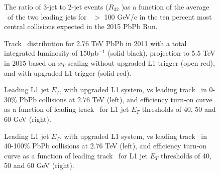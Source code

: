 \begin{figure}[!ht]
\begin{center}
\caption{The ratio of 3-jet to 2-jet events ($R_{32}$ )as a function of the
average \pt\ of the two leading jets for \pt\ $> $ 100 GeV/c 
in the ten percent most central collisions expected in the 2015 PbPb Run.}
\label{fig:r32_2015}
\end{center}
\end{figure}

\begin{figure}[!ht]
\begin{center}
\caption{Track \pt\ distribution for 2.76 TeV PbPb in 2011 with a total
integrated luminosity
         of 150$\mu$b$^{-1}$ (solid black), projection to 5.5 TeV in 2015
based on $x_T$ scaling 
         without upgraded L1 trigger (open red), and with upgraded L1
trigger (solid red).}
\label{fig:xT_scaling}
\end{center}
\end{figure}

\begin{figure}[!ht]
\begin{center}
\caption{Leading L1 jet $E_T$, with upgraded L1 system, vs leading track
\pt\ in 0-30\% PbPb collisions
at 2.76 TeV (left), and efficiency turn-on curve as a function of leading
track \pt\ for L1 jet $E_T$
thresholds of 40, 50 and 60 GeV (right).}
\label{fig:trigEff_track2015_central}
\end{center}
\end{figure}

\begin{figure}[!ht]
\begin{center}
\caption{Leading L1 jet $E_T$, with upgraded L1 system, vs leading track
\pt\ in 40-100\% PbPb collisions
at 2.76 TeV (left), and efficiency turn-on curve as a function of leading
track \pt\ for L1 jet $E_T$
thresholds of 40, 50 and 60 GeV (right).}
\label{fig:trigEff_track2015_peripheral}
\end{center}
\end{figure}

